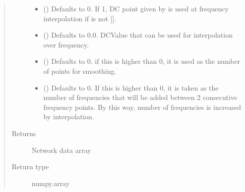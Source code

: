 \documentclass[letterpaper,10pt,english]{sphinxmanual}
\begin{document}
\begin{fulllineitems}
\begin{fulllineitems}
\begin{quote}
\begin{description}
\begin{itemize}
\item {} 
 (\sphinxstyleliteralemphasis{\sphinxupquote{, }}) \textendash{} Defaults to 0. If 1, DC point given by  is used at frequency interpolation if  is not {[}{]}.

\item {} 
 (\sphinxstyleliteralemphasis{\sphinxupquote{, }}) \textendash{} Defaults to 0.0. DCValue that can be used for interpolation over frequency.

\item {} 
 (\sphinxstyleliteralemphasis{\sphinxupquote{, }}) \textendash{} Defaults to 0. if this is higher than 0, it is used as the number of points for smoothing.

\item {} 
 (\sphinxstyleliteralemphasis{\sphinxupquote{, }}) \textendash{} Defaults to 0. If this is higher than 0, it is taken as the number of frequencies that will be added between 2 consecutive frequency points. By this way, number of frequencies is increased by interpolation.

\end{itemize}

\item[{Returns}] \leavevmode
Network data array

\item[{Return type}] \leavevmode
numpy.array

\end{description}\end{quote}

\end{fulllineitems}


\begin{fulllineitems}
\label{\detokenize{touchstone:touchstone.spfile.dosyaoku}}
\end{fulllineitems}


\end{fulllineitems}
\end{document}
